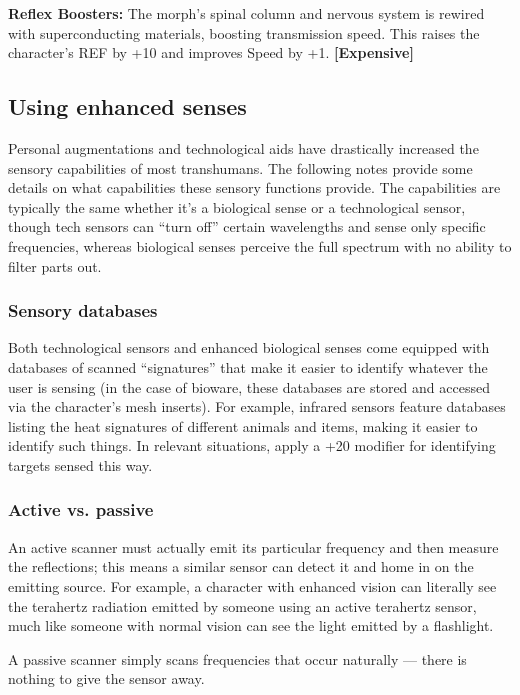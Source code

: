 \textbf{Reflex Boosters:} The morph’s spinal column and nervous system is rewired with superconducting materials, boosting transmission speed. This raises the character’s REF by +10 and improves Speed by +1. \textbf{[Expensive]}

\subsection{Using enhanced senses}
\label{sec:using-enhanced-senses}

Personal augmentations and technological aids have drastically increased the sensory capabilities of most transhumans. The following notes provide some details on what capabilities these sensory functions provide. The capabilities are typically the same whether it’s a biological sense or a technological sensor, though tech sensors can ``turn off'' certain wavelengths and sense only specific frequencies, whereas biological senses perceive the full spectrum with no ability to filter parts out.

\subsubsection{Sensory databases}

Both technological sensors and enhanced biological senses come equipped with databases of scanned ``signatures'' that make it easier to identify whatever the user is sensing (in the case of bioware, these databases are stored and accessed via the character’s mesh inserts). For example, infrared sensors feature databases listing the heat signatures of different animals and items, making it easier to identify such things. In relevant situations, apply a +20 modifier for identifying targets sensed this way.

\subsubsection{Active vs. passive}

An active scanner must actually emit its particular frequency and then measure the reflections; this means a similar sensor can detect it and home in on the emitting source. For example, a character with enhanced vision can literally see the terahertz radiation emitted by someone using an active terahertz sensor, much like someone with normal vision can see the light emitted by a flashlight.

A passive scanner simply scans frequencies that occur naturally --- there is nothing to give the sensor away.

